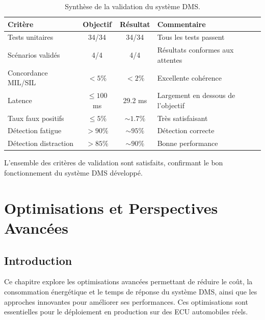 \documentclass[12pt,a4paper,twoside]{report}
\begin{document}
\begin{table}[H]
\centering
\caption{Synthèse de la validation du système DMS.}
\label{tab:validation_summary}
\renewcommand{\arraystretch}{1.4}
\begin{tabularx}{\textwidth}{|l|c|c|X|}
\hline
\rowcolor{stellantisblue!15}
\textbf{Critère} & \textbf{Objectif} & \textbf{Résultat} & \textbf{Commentaire} \\
\hline
Tests unitaires & 34/34 & \cellcolor{green!20} 34/34 & Tous les tests passent \\
\hline
Scénarios validés & 4/4 & \cellcolor{green!20} 4/4 & Résultats conformes aux attentes \\
\hline
Concordance MIL/SIL & $< 5\%$ & \cellcolor{green!20} $< 2\%$ & Excellente cohérence \\
\hline
Latence & $\leq 100$ ms & \cellcolor{green!20} 29.2 ms & Largement en dessous de l'objectif \\
\hline
Taux faux positifs & $\leq 5\%$ & \cellcolor{green!20} $\sim 1.7\%$ & Très satisfaisant \\
\hline
Détection fatigue & $> 90\%$ & \cellcolor{green!20} $\sim 95\%$ & Détection correcte \\
\hline
Détection distraction & $> 85\%$ & \cellcolor{green!20} $\sim 90\%$ & Bonne performance \\
\hline
\end{tabularx}
\end{table}

L'ensemble des critères de validation sont satisfaits, confirmant le bon fonctionnement du système DMS développé.


\chapter{Optimisations et Perspectives Avancées}

\section{Introduction}

Ce chapitre explore les optimisations avancées permettant de réduire le coût, la consommation énergétique et le temps de réponse du système DMS, ainsi que les approches innovantes pour améliorer ses performances. Ces optimisations sont essentielles pour le déploiement en production sur des ECU automobiles réels.
\end{document}
